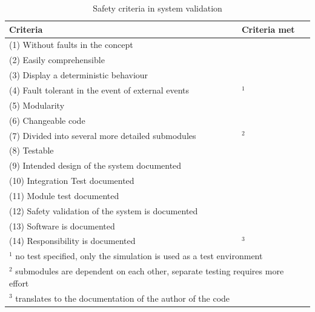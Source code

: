 		\begin{table}[H]
		\centering	
		\caption{Safety criteria in system validation}
		\begin{tabular}{ l l } 
	\toprule
	Criteria & Criteria met \\
	\midrule
	(1)  Without faults in the concept  &  \cmark \\
	(2)  Easily comprehensible 			&   \cmark\\
	(3)  Display a deterministic behaviour &\cmark\\
	(4)  Fault tolerant in the event of external events &\xmark$^1$\\
	(5)  Modularity 					&\cmark\\
	(6)  Changeable code 				&\cmark\\
	(7)  Divided into several more detailed submodules &\cmark $^2$\\
	(8)	 Testable 						&\cmark\\
	(9)  Intended design of the system documented &\cmark\\
	(10) Integration Test documented	&\cmark\\
	(11) Module test documented 		&\cmark\\
	(12) Safety validation of the system is documented &\cmark\\
	(13) Software is documented &\cmark\\
	(14) Responsibility is documented  &\cmark $^3$\\
	\bottomrule
	
	\multicolumn{2}{l}{\small $^1$ no test specified, only the simulation is used as a test environment } \\
	\multicolumn{2}{l}{\small $^2$ submodules are dependent on each other, separate testing requires more effort } \\
	\multicolumn{2}{l}{\small $^3$ translates to the documentation of the author of the code} \\
\end{tabular}
\label{tab_veri}
\end{table}

